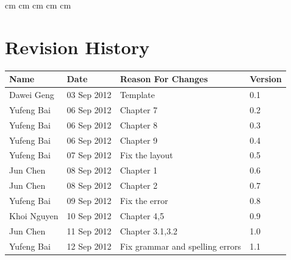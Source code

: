\documentclass[11pt, a4paper]{report}
\begin{document}
 cm
 cm
 cm
 cm
 cm

\tableofcontents






\clearpage
\section*{Revision History}
\begin{tabular}{| l | l | l | l | }
\hline
Name      		&	Date        	&	Reason For Changes                  	  	&	Version     	\\ \hline
Dawei Geng      &	03 Sep 2012     &	Template			                  	  	&	0.1 	    	\\ \hline
Yufeng Bai         &	06 Sep 2012	&	Chapter 7						&	0.2		\\ \hline
Yufeng Bai	&	06 Sep 2012	&	Chapter 8						&	0.3		\\ \hline
Yufeng Bai	&	06 Sep 2012	&	Chapter 9						&	0.4		\\ \hline
Yufeng Bai	&	07 Sep 2012	&	Fix the layout					&	0.5		\\ \hline
Jun Chen    	&  	 08 Sep 2012 	&	Chapter 1                  	  			&	0.6     	\\ \hline
Jun Chen   	&	08 Sep 2012 	&	Chapter 2                 	  			&	0.7     	\\ \hline
Yufeng Bai	&	09 Sep 2012	&	Fix the error					&	0.8		\\ \hline
Khoi Nguyen 	&	10 Sep 2012     &	Chapter 4,5             				&	0.9     	\\ \hline
Jun Chen		&	11 Sep 2012	&	Chapter 3.1,3.2                	  		&	1.0    		\\\hline
Yufeng Bai	&	12 Sep 2012	&	Fix grammar and spelling errors	&	1.1		\\ \hline
%





\end{tabular}
\clearpage
\end{document}
